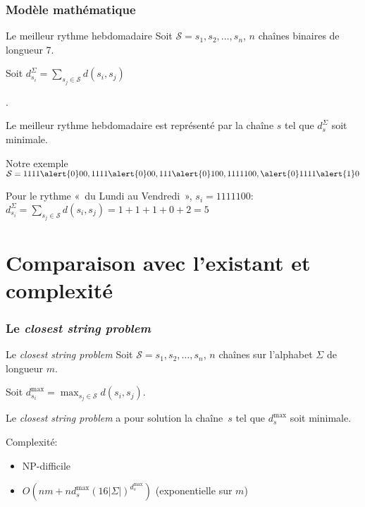 \documentclass[table]{beamer}
\newcommand{\+}{\cellcolor[gray]{1}\bfseries}
\newcommand{\<}{\cellcolor[gray]{0.8}\rmfamily\itshape}
\def\S{\mathcal{S}}
\newcommand{\nologo}{\setbeamertemplate{logo}{}}
\newcommand*{\foreign}[2][english]{%
    \emph{\foreignlanguage{#1}{#2}}%
}
\newenvironment{dispmath}{%
    \centering\begin{math}\displaystyle
}{\end{math}\par}
\begin{document}
{\nologo
\begin{frame}
  \frametitle{Modèle mathématique}

  \begin{block}{Le meilleur rythme hebdomadaire}
    Soit $\S = s_1, s_2, \ldots, s_n$, $n$ chaînes binaires de
    longueur 7.

    Soit
    \begin{dispmath}
      d^\Sigma_{s_i} = \sum_{s_j\in\S} d(s_i, s_j)
    \end{dispmath}.

    Le meilleur rythme hebdomadaire est représenté par la chaîne $s$
    tel que $d^\Sigma_s$ soit minimale.
  \end{block}

  \begin{block}{Notre exemple}
    \begin{dispmath}
      \S = 1111\alert{0}00, 1111\alert{0}00, 111\alert{0}100, 1111100,
      \alert{0}1111\alert{1}0
    \end{dispmath}

    Pour le rythme «~du Lundi au Vendredi~», $s_i = 1111100$:
    \begin{dispmath}
      d^\Sigma_{s_i} = \sum_{s_j\in\S} d(s_i, s_j)
      = 1 + 1 + 1 + 0 + 2 = 5
    \end{dispmath}
  \end{block}
\end{frame}
}

\section{Comparaison avec l'existant et complexité}

\begin{frame}
  \frametitle{Le \foreign{closest string problem}}

  \begin{block}{Le \foreign{closest string problem}}
    Soit $\S = s_1, s_2, \ldots, s_n$, $n$ chaînes sur l'alphabet
    $\Sigma$ de longueur $m$.

    Soit $\displaystyle d^{\max}_{s_i} = \max_{s_j\in\S} d(s_i, s_j)$.

    Le \emph{closest string problem} a pour solution la chaîne~$s$ tel
    que $d^{\max}_s$ soit minimale.
  \end{block}

  Complexité:
  \begin{itemize}
  \item NP-difficile \cite{lanctot2003distinguishing}
  \item $O(nm + nd^{\max}_s(16|\Sigma|)^{d^{\max}_s})$
    \cite{ma2008more} (exponentielle sur $m$)
  \end{itemize}
\end{frame}
\end{document}
